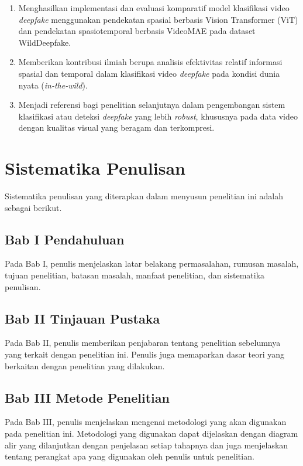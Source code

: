 \begin{enumerate}[noitemsep]
	\item Menghasilkan implementasi dan evaluasi komparatif model klasifikasi video \textit{deepfake} menggunakan pendekatan spasial berbasis Vision Transformer (ViT) dan pendekatan spasiotemporal berbasis VideoMAE pada dataset WildDeepfake.
	\item Memberikan kontribusi ilmiah berupa analisis efektivitas relatif informasi spasial dan temporal dalam klasifikasi video \textit{deepfake} pada kondisi dunia nyata (\textit{in-the-wild}).
	\item Menjadi referensi bagi penelitian selanjutnya dalam pengembangan sistem klasifikasi atau deteksi \textit{deepfake} yang lebih \textit{robust}, khususnya pada data video dengan kualitas visual yang beragam dan terkompresi.
\end{enumerate}


\section{Sistematika Penulisan} \label{I.Sistematika}
Sistematika penulisan yang diterapkan dalam menyusun penelitian ini adalah sebagai berikut. \par

\subsection{Bab I Pendahuluan}
Pada Bab I, penulis menjelaskan latar belakang permasalahan, rumusan masalah, tujuan penelitian, batasan masalah, manfaat penelitian, dan sistematika penulisan. \par

\subsection{Bab II Tinjauan Pustaka}
Pada Bab II, penulis memberikan penjabaran tentang penelitian sebelumnya yang terkait dengan penelitian ini. Penulis juga memaparkan dasar teori yang berkaitan dengan penelitian yang dilakukan. \par

\subsection{Bab III Metode Penelitian}
Pada Bab III, penulis menjelaskan mengenai metodologi yang akan digunakan pada penelitian ini. Metodologi yang digunakan dapat dijelaskan dengan diagram alir yang dilanjutkan dengan penjelasan setiap tahapnya dan juga menjelaskan tentang perangkat apa yang digunakan oleh penulis untuk penelitian. \par

